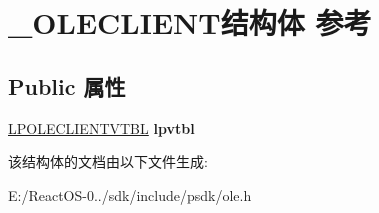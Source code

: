 \hypertarget{struct___o_l_e_c_l_i_e_n_t}{}\section{\+\_\+\+O\+L\+E\+C\+L\+I\+E\+N\+T结构体 参考}
\label{struct___o_l_e_c_l_i_e_n_t}
\subsection*{Public 属性}
\begin{DoxyCompactItemize}
\item 
\mbox{\label{struct___o_l_e_c_l_i_e_n_t_ab4acf62d108509fc168e10281f76d912}} 
\hyperlink{struct___o_l_e_c_l_i_e_n_t_v_t_b_l}{L\+P\+O\+L\+E\+C\+L\+I\+E\+N\+T\+V\+T\+BL} {\bfseries lpvtbl}
\end{DoxyCompactItemize}


该结构体的文档由以下文件生成\+:\begin{DoxyCompactItemize}
\item 
E\+:/\+React\+O\+S-\/0../sdk/include/psdk/ole.\+h\end{DoxyCompactItemize}
